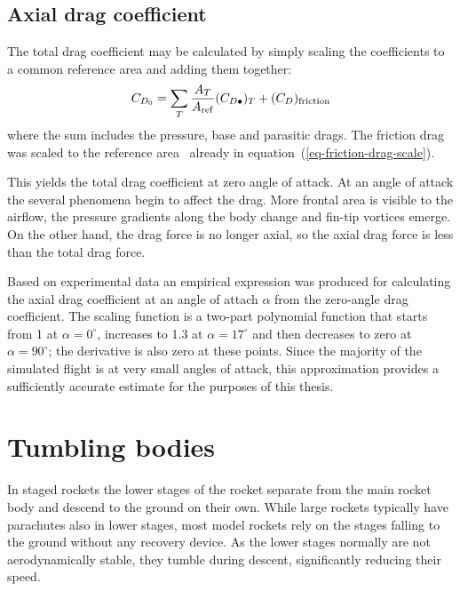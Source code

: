 \subsection{Axial drag coefficient}
\label{sec-axial-drag}

The total drag coefficient may be calculated by simply scaling the
coefficients to a common reference area and adding them together:
%
\begin{equation}
C_{D_0} = \sum_T \frac{A_T}{A_{\rm ref}}(C_{D\bullet})_T
 + (C_D)_{\rm friction}
\end{equation}
%
where the sum includes the pressure, base and parasitic drags.  The
friction drag was scaled to the reference area \Aref\ already in
equation~(\ref{eq-friction-drag-scale}).

This yields the total drag coefficient at zero angle of attack.  At an
angle of attack the several phenomena begin to affect the drag.
More frontal area is visible to the airflow, the pressure gradients
along the body change and fin-tip vortices emerge.  On the other hand,
the drag force is no longer axial, so the axial drag force is less
than the total drag force.

Based on experimental data an empirical expression was produced for
calculating the axial drag coefficient at an angle of attach $\alpha$
from the zero-angle drag coefficient.  The scaling function is a
two-part polynomial function that starts from 1 at $\alpha=0^\circ$,
increases to 1.3 at $\alpha=17^\circ$ and then decreases to zero at
$\alpha=90^\circ$; the derivative is also zero at these points.  Since
the majority of the simulated flight is at very small angles of
attack, this approximation provides a sufficiently accurate estimate
for the purposes of this thesis.


\section{Tumbling bodies}
\label{sec-tumbling-bodies}

%
%

In staged rockets the lower stages of the rocket separate from the
main rocket body and descend to the ground on their own.  While large
rockets typically have parachutes also in lower stages, most model
rockets rely on the stages falling to the ground without any recovery
device.  As the lower stages normally are not aerodynamically stable,
they tumble during descent, significantly reducing their speed.

